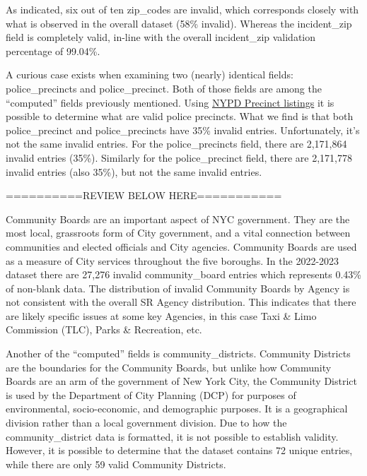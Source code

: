 \documentclass[12pt, titlepage]{article}
\begin{document}
As indicated, six out of ten zip\_codes are invalid, which corresponds closely 
with what is observed in the overall dataset (58\% invalid). Whereas 
the incident\_zip field is completely valid, in-line with the 
overall incident\_zip validation percentage of 99.04\%.


\label{sec:police-precincts}
A curious case exists when examining two (nearly) identical 
fields: police\_precincts and police\_precinct. Both of those fields 
are among the ``computed'' fields previously mentioned. Using 
\href{https://www.nyc.gov/site/nypd/bureaus/patrol/precincts-landing.page}
{NYPD Precinct listings} it is possible to determine what are valid 
police precincts. What we find is that both police\_precinct 
and police\_precincts  have  35\% invalid entries. Unfortunately, 
it's not the same invalid entries. For the police\_precincts field, 
there are 2,171,864 invalid entries (35\%). Similarly for the 
police\_precinct field, there are 2,171,778 invalid entries 
(also 35\%), but not the same invalid entries. 

==========REVIEW BELOW HERE===========	
	
\label{sec:communityboards}
Community Boards are an important aspect of NYC government. They are the 
most local, grassroots form of City government, and a vital connection 
between communities and elected officials and City agencies. Community 
Boards are used as a measure of City services throughout the five 
boroughs. In the 2022-2023 dataset there are 27,276 invalid community\_board 
entries which represents 0.43\% of non-blank data. The distribution 
of invalid Community Boards by Agency is not consistent with 
the overall SR Agency distribution. This indicates that there are likely 
specific issues at some key Agencies, in this case Taxi \& Limo 
Commission (TLC), Parks \& Recreation, etc. 

\label{sec:communitydistrict}
Another of the ``computed'' fields is community\_districts. Community Districts 
are the boundaries for the Community Boards, but unlike how 
Community Boards are an arm of the government of New York City, 
the Community District is used by the Department of City Planning 
(DCP) for purposes of environmental, socio-economic, and demographic 
purposes. It is a geographical division rather than a local 
government division. Due to how the community\_district data 
is formatted, it is not possible to establish validity. However, 
it is possible to determine that the dataset contains 72 unique 
entries, while there are only 59 valid Community Districts. 
	
\end{document}
